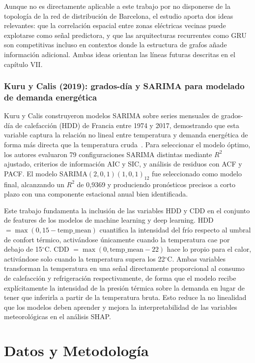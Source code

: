 \documentclass[12pt, a4paper]{article}
\begin{document}
Aunque no es directamente aplicable a este trabajo por no disponerse de la topología de la red de distribución de Barcelona, el estudio aporta dos ideas relevantes: que la correlación espacial entre zonas eléctricas vecinas puede explotarse como señal predictora, y que las arquitecturas recurrentes como GRU son competitivas incluso en contextos donde la estructura de grafos añade información adicional. Ambas ideas orientan las líneas futuras descritas en el capítulo VII.

\subsubsection{Kuru y Calis (2019): grados-día y SARIMA para modelado de demanda energética}


Kuru y Calis construyeron modelos SARIMA sobre series mensuales de grados-día de calefacción (HDD) de Francia entre 1974 y 2017, demostrando que esta variable captura la relación no lineal entre temperatura y demanda energética de forma más directa que la temperatura cruda~\cite{kuru2019}. Para seleccionar el modelo óptimo, los autores evaluaron 79 configuraciones SARIMA distintas mediante $R^2$ ajustado, criterios de información AIC y SIC, y análisis de residuos con ACF y PACF. El modelo SARIMA$(2,0,1)(1,0,1)_{12}$ fue seleccionado como modelo final, alcanzando un $R^2$ de 0,9369 y produciendo pronósticos precisos a corto plazo con una componente estacional anual bien identificada.

Este trabajo fundamenta la inclusión de las variables HDD y CDD en el conjunto de features de los modelos de machine learning y deep learning. HDD $= \max(0, 15 - \text{temp\_mean})$ cuantifica la intensidad del frío respecto al umbral de confort térmico, activándose únicamente cuando la temperatura cae por debajo de 15$^\circ$C. CDD $= \max(0, \text{temp\_mean} - 22)$ hace lo propio para el calor, activándose solo cuando la temperatura supera los 22$^\circ$C. Ambas variables transforman la temperatura en una señal directamente proporcional al consumo de calefacción y refrigeración respectivamente, de forma que el modelo recibe explícitamente la intensidad de la presión térmica sobre la demanda en lugar de tener que inferirla a partir de la temperatura bruta. Esto reduce la no linealidad que los modelos deben aprender y mejora la interpretabilidad de las variables meteorológicas en el análisis SHAP.

\section{Datos y Metodología}
\end{document}
